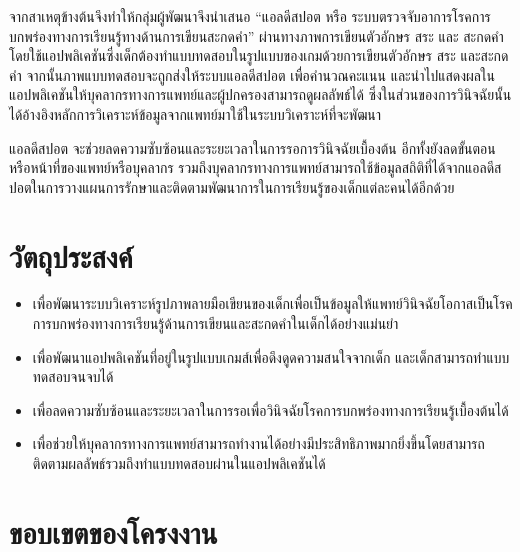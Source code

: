 \documentclass[12pt,oneside,openright,a4paper]{cpe-thai-project}
\begin{document}
\par จากสาเหตุข้างต้นจึงทำให้กลุ่มผู้พัฒนาจึงนำเสนอ “แอลดีสปอต หรือ ระบบตรวจจับอาการโรคการบกพร่องทางการเรียนรู้ทางด้านการเขียนสะกดคำ” ผ่านทางภาพการเขียนตัวอักษร สระ และ สะกดคำโดยใช้แอปพลิเคชันซึ่งเด็กต้องทำแบบทดสอบในรูปแบบของเกมด้วยการเขียนตัวอักษร สระ และสะกดคำ จากนั้นภาพแบบทดสอบจะถูกส่งให้ระบบแอลดีสปอต เพื่อคำนวณคะแนน และนำไปแสดงผลในแอปพลิเคชันให้บุคลากรทางการแพทย์และผู้ปกครองสามารถดูผลลัพธ์ได้ ซึ่งในส่วนของการวินิจฉัยนั้นได้อ้างอิงหลักการวิเคราะห์ข้อมูลจากแพทย์มาใช้ในระบบวิเคราะห์ที่จะพัฒนา
\par แอลดีสปอต จะช่วยลดความซับซ้อนและระยะเวลาในการรอการวินิจฉัยเบื้องต้น อีกทั้งยังลดขั้นตอนหรือหน้าที่ของแพทย์หรือบุคลากร รวมถึงบุคลากรทางการแพทย์สามารถใช้ข้อมูลสถิติที่ได้จากแอลดีสปอตในการวางแผนการรักษาและติดตามพัฒนาการในการเรียนรู้ของเด็กแต่ละคนได้อีกด้วย





\section{วัตถุประสงค์}

\begin{itemize}
  \item  เพื่อพัฒนาระบบวิเคราะห์รูปภาพลายมือเขียนของเด็กเพื่อเป็นข้อมูลให้แพทย์วินิจฉัยโอกาสเป็นโรคการบกพร่องทางการเรียนรู้ด้านการเขียนและสะกดคำในเด็กได้อย่างแม่นยำ
  \item  เพื่อพัฒนาแอปพลิเคชันที่อยู่ในรูปแบบเกมส์เพื่อดึงดูดความสนใจจากเด็ก และเด็กสามารถทำแบบทดสอบจนจบได้ 
  \item  เพื่อลดความซับซ้อนและระยะเวลาในการรอเพื่อวินิจฉัยโรคการบกพร่องทางการเรียนรู้เบื้องต้นได้ 
  \item  เพื่อช่วยให้บุคลากรทางการแพทย์สามารถทำงานได้อย่างมีประสิทธิภาพมากยิ่งขึ้นโดยสามารถติดตามผลลัพธ์รวมถึงทำแบบทดสอบผ่านในแอปพลิเคชันได้  
  \end{itemize}

\section{ขอบเขตของโครงงาน}
\end{document}
